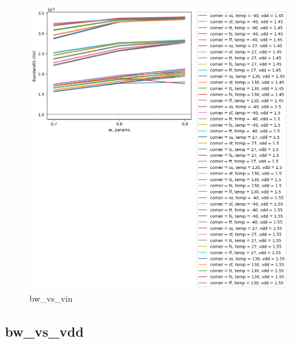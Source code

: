 \documentclass[
  a4paper,
  DIV=11,
  numbers=noendperiod]{scrartcl}
\begin{document}
\begin{tcolorbox}
\begin{figure}[H]
{\centering \includegraphics{./cace/_docs/ota-5t/schematic/bw_vs_vin.png}

}

\caption{bw\_vs\_vin}

\end{figure}%

\subsection*{bw\_vs\_vdd}\label{bw_vs_vdd}

\begin{figure}[H]


\end{figure}
\end{tcolorbox}
\end{document}
